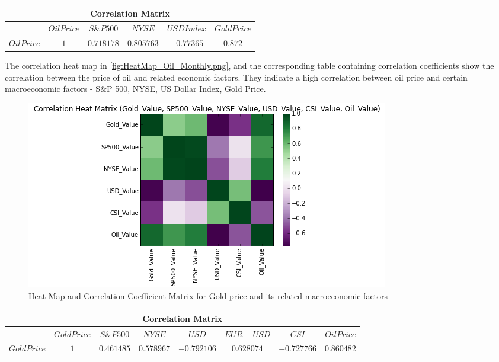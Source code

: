 \documentclass[runningheads]{llncs}
\begin{document}
\begin{center}
\begin{tabular}{|c|c|c|c|c|c|}
\hline
\multicolumn{6}{|c|}{Correlation Matrix} \\
\hline
$ $ & $Oil Price$ & $ S\&P 500 $ & $ NYSE $ & $ USD Index $ & $Gold Price$ \\ [0.5ex]  \hline
$Oil Price$ & $ 1 $ & $0.718178$ & $0.805763$ & $-0.77365$ & $0.872$ \\ \hline
\end{tabular}
\end{center}

The correlation heat map in \autoref{fig:HeatMap_Oil_Monthly.png}, and the corresponding table containing correlation coefficients show the correlation between the price of oil and related economic factors. They indicate a high correlation between oil price and certain macroeconomic factors - S\&P 500, NYSE, US Dollar Index, Gold Price.

\begin{figure}
\centering
\includegraphics[width=\textwidth]{HeatMap_Gold_Monthly.png}
\caption{Heat Map and Correlation Coefficient Matrix for Gold price and its related macroeconomic factors}
\label{fig:HeatMap_Gold_Daily.png}
\end{figure}

\begin{center}
\begin{tabular}{|c|c|c|c|c|c|c|c|}
\hline
\multicolumn{8}{|c|}{Correlation Matrix} \\
\hline
$ $ & $Gold Price$ & $ S\&P 500 $ & $ NYSE $ & $ USD $ & $EUR-USD$ & $CSI$ &$Oil Price$ \\ [0.5ex]  \hline
$Gold Price$ & $ 1 $ & $0.461485$ & $0.578967$ & $-0.792106$ & $0.628074$ & $-0.727766$ & $0.860482$ \\ \hline
\end{tabular}
\end{center}
\end{document}
